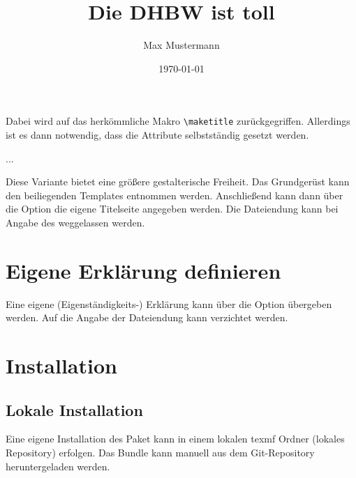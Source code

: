 \documentclass[babel=ngerman,highlight=false]{skdoc}
\begin{document}
            Dabei wird auf das herkömmliche Makro \verb|\maketitle| zurückgegriffen. Allerdings ist es dann notwendig, dass die Attribute selbstständig gesetzt werden.
            \begin{sourcecode}
\title{Die DHBW ist toll}
\author{Max Mustermann}
\date{\today}
...
\maketitle
            \end{sourcecode}

            Diese Variante bietet eine größere gestalterische Freiheit. Das Grundgerüst kann den beiliegenden Templates entnommen werden. Anschließend kann dann über die Option  die eigene Titelseite angegeben werden. Die Dateiendung kann bei Angabe des  weggelassen werden.

        \section{Eigene Erklärung definieren}
            Eine eigene (Eigenständigkeits-) Erklärung kann über die Option  übergeben werden. Auf die Angabe der Dateiendung kann verzichtet werden.


    \section{Installation}
        \subsection{Lokale Installation}
            Eine eigene Installation des Paket kann in einem lokalen texmf Ordner (lokales Repository) erfolgen. Das Bundle kann manuell aus dem Git-Repository heruntergeladen werden.
\end{document}

